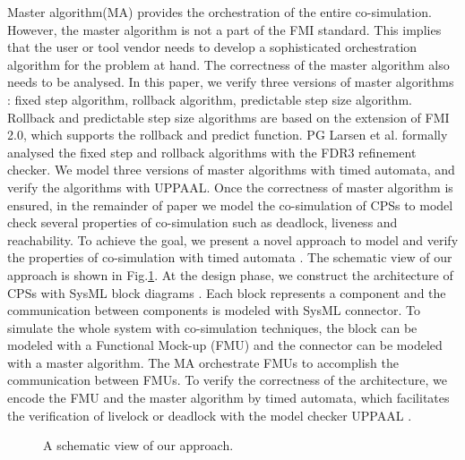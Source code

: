 Master algorithm(MA) \cite{AckerDVM15} provides the orchestration of the entire co-simulation. However, the master algorithm is not a part of the FMI standard. This implies that the user or tool vendor needs to develop a sophisticated orchestration algorithm for the problem at hand. The correctness of the master algorithm also needs to be analysed. In this paper, we verify three versions of master algorithms \cite{BromanBGLMTW13}: fixed step algorithm, rollback algorithm, predictable step size algorithm. Rollback and predictable step size algorithms are based on the extension of FMI 2.0, which supports the rollback and predict function. PG Larsen et al. \cite{Larsen2016Integrated} 
formally analysed the fixed step and rollback algorithms with the FDR3 refinement checker. We model three versions of master algorithms with timed automata, and verify the algorithms with UPPAAL. Once the correctness of master algorithm is ensured, in the remainder of paper we model the co-simulation of CPSs to model check several properties of co-simulation such as deadlock, liveness and reachability. 
To achieve the goal, we present a novel approach to model and verify the properties of co-simulation with timed automata \cite{AlurD94}. The schematic view of our approach is shown in Fig.\ref{paper-arc}.
At the design phase, we construct the architecture of CPSs with SysML block diagrams \cite{RahimHI17}. Each block represents a component and the communication between components is modeled with SysML connector. To simulate the whole system with co-simulation techniques, the block can be modeled with a Functional Mock-up (FMU) and the connector can be modeled with a master algorithm. The MA orchestrate FMUs to accomplish the communication between FMUs. To verify the correctness of the architecture, we encode the FMU and the master algorithm by timed automata, which facilitates the verification of livelock or deadlock with the model checker UPPAAL \cite{BehrmannDLHPYH06}.
\begin{figure}[htbp]
	\caption{A schematic view of our approach.}
	\label{paper-arc}
\end{figure}


